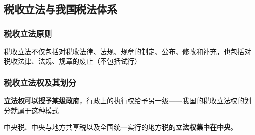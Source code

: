\documentclass[UTF8,12pt]{ctexart}
\numberwithin{equation}{section} %
\numberwithin{figure}{section}
\numberwithin{table}{section}
\begin{document}
	\subsection{税收立法与我国税法体系}
	
	\subsubsection{税收立法原则}
	税收立法不仅包括对税收法律、法规、规章的制定、公布、修改和补充，也包括对税收法律、法规、规章的废止（不包括试行）
	
	\subsubsection{税收立法权及其划分}
	\textbf{立法权可以授予某级政府}，行政上的执行权给予另一级——我国的税收立法权的划分就属于这种模式
	
	中央税、中央与地方共享税以及全国统一实行的地方税的\textbf{立法权集中在中央}。
	
\end{document}
